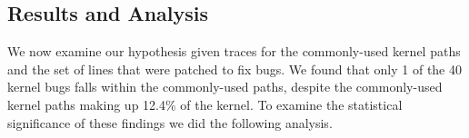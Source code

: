 \subsection{Results and Analysis}
\label{Verification-of-Hypothesis}


%
%


%
%
We now examine our hypothesis given traces for the commonly-used kernel
paths and the set of lines that were patched to fix bugs. We found that
only 1 of the 40 kernel bugs falls within the commonly-used paths, despite
the commonly-used kernel paths making up 12.4\% of the kernel.
To examine the statistical significance of these findings we did the following
analysis.

